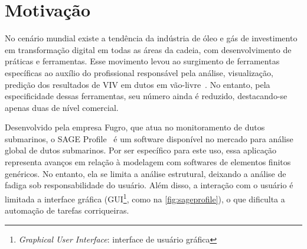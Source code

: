 \section{Motivação}



No cenário mundial existe a tendência da indústria de óleo e gás de investimento em transformação digital em todas as áreas da cadeia, com desenvolvimento de práticas e ferramentas. Esse movimento levou ao surgimento de ferramentas específicas ao auxílio do profissional responsável pela análise, visualização, predição dos resultados de VIV em dutos em vão-livre~\cite{Mittal2017}. No entanto, pela especificidade dessas ferramentas, seu número ainda é reduzido, destacando-se apenas duas de nível comercial.




Desenvolvido pela empresa Fugro, que atua no monitoramento de dutos submarinos, o SAGE Profile~\cite{sageprofile} é um software disponível no mercado para análise global de dutos submarinos.
Por ser específico para este uso, essa aplicação representa avanços em relação à modelagem com softwares de elementos finitos genéricos.
No entanto, ela se limita a análise estrutural, deixando a análise de fadiga sob responsabilidade do usuário.
Além disso, a interação com o usuário é limitada a interface gráfica (GUI\footnote{\textit{Graphical User Interface}: interface de usuário gráfica}, como na \autoref{fig:sageprofile}), o que dificulta a automação de tarefas corriqueiras.

